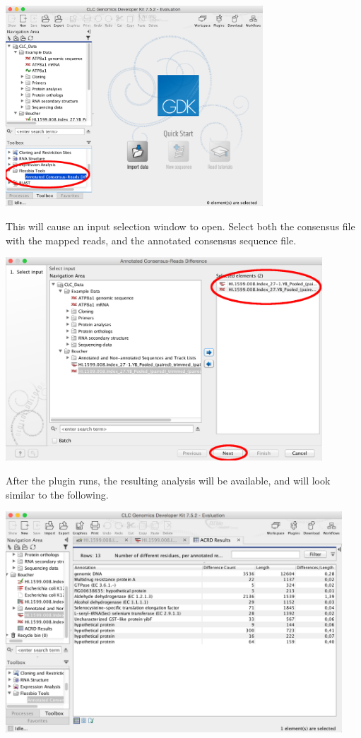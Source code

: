 \documentclass[12pt,letterpaper]{article}
\begin{document}
\begin{center}
    \includegraphics[width=26em]{acrd_toolbox.png}
\end{center}

This will cause an input selection window to open.  Select both the consensus
file with the mapped reads, and the annotated consensus sequence file.

\begin{center}
    \includegraphics[width=32em]{select_files.png}
\end{center}

After the plugin runs, the resulting analysis will be available, and will look
similar to the following.

\begin{center}
    \includegraphics[width=34em]{results.png}
\end{center}
\end{document}
